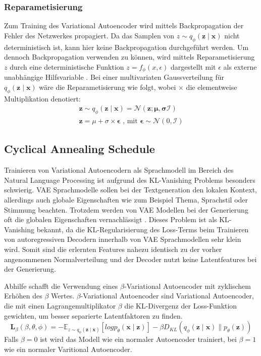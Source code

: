 \subsubsection{Reparametisierung} %
Zum Training des Variational Autoencoder wird mittels Backpropagation der Fehler des Netzwerkes propagiert. Da das Samplen von $z \sim q_\phi(\mathbf{z\mid x})$ nicht deterministisch ist, kann hier keine Backpropagation durchgeführt werden.
Um dennoch Backpropagation verwenden zu können, wird mittels Reparametisierung $z$ durch eine deterministische Funktion $z=f_\phi(x,\epsilon)$ dargestellt mit $\epsilon$ als externe unabhängige Hilfsvariable \citep{kingma2014autoencoding,jordan_2018}. 
Bei einer multivariaten Gaussverteilung für $q_\phi (\mathbf{z\mid x})$ wäre die Reparametisierung wie folgt, wobei $\times$ die elementweise Multiplikation denotiert:
\begin{align}
    \mathbf{z} \sim q_\phi(\mathbf{z\mid x}) = \mathcal{N}(\mathbf{z;\mu,\sigma \mathcal{I}}) \nonumber \\
    \mathbf{z} = \mu + \sigma \times \mathbf{\epsilon} \text{ , mit } \mathbf{\epsilon} \sim \mathcal{N}(0,\mathcal{I}) 
\end{align}

\subsection{Cyclical Annealing Schedule}
\label{cyc_anneal}
Trainieren von Variational Autoencodern als Sprachmodell im Bereich des Natural Language Processing ist aufgrund des KL-Vanishing Problems besonders schwierig.
VAE Sprachmodelle sollen bei der Textgeneration den lokalen Kontext, allerdings auch globale Eigenschaften wie zum Beispiel Thema, Sprachstil oder Stimmung beachten. 
Trotzdem werden von VAE Modellen bei der Generierung oft die globalen Eigenschaften vernachlässigt \citep{cyc_anneal}. 
Dieses Problem ist als KL-Vanishing bekannt, da die KL-Regularisierung des Loss-Terms beim Trainieren von autoregressiven Decodern innerhalb von VAE Sprachmodellen sehr klein wird.
Somit sind die erlernten Features nahezu identisch zu der vorher angenommenen Normalverteilung und der Decoder nutzt keine Latentfeatures bei der Generierung. %

Abhilfe schafft die Verwendung eines $\beta$-Variational Autoencoder \citep{cyc_anneal} mit zyklischem Erhöhen des $\beta$ Wertes.
$\beta$-Variational Autoencoder sind Variational Autoencoder, die mit einen Lagrangemultiplikator $\beta$ die KL-Divergenz der Loss-Funktion gewichten, um besser separierte Latentfaktoren zu finden.
\begin{equation}
    \mathbf{L}_{\beta} (\beta,\theta,\phi)= -\mathbb{E}_{z\sim q_\phi(\mathbf{z\mid x})}[log p_\theta (\mathbf{x\mid z})]- \beta D_{KL}(q_\phi(\mathbf{z\mid x}) \parallel p_\theta(\mathbf{z})) 
\end{equation}
Falls $\beta = 0$ ist wird das Modell wie ein normaler Autoencoder trainiert, bei $\beta = 1$ wie ein normaler Varitional Autoencoder.

